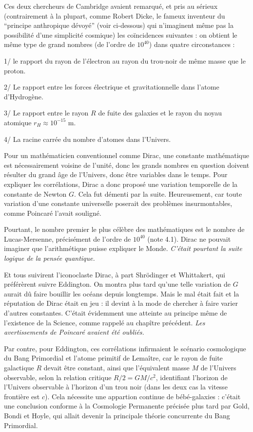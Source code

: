 \documentclass[a4paper,12pt]{article}
\begin{document}
     Ces deux chercheurs de Cambridge avaient remarqué, et pris au sérieux (contrairement à la plupart, comme Robert Dicke, le fameux inventeur du ``principe anthropique dévoyé'' (voir ci-dessous) qui n'imaginent même pas la possibilité d'une simplicité cosmique) les coïncidences suivantes : on obtient le même type de grand nombres (de l'ordre de $10^40$) dans quatre circonstances :

1/ le rapport du rayon de l'électron au rayon du trou-noir de même masse que le proton.

2/ Le rapport entre les forces électrique et gravitationnelle dans l'atome d'Hydrogène.

3/ Le rapport entre le rayon $R$ de fuite des galaxies et le rayon du noyau atomique $r_H \approx 10^{-15}$ m.

4/ La racine carrée du nombre d'atomes dans l'Univers.


Pour un mathématicien conventionnel comme Dirac, une constante mathématique est nécessairement voisine de l'unité, donc les grands nombres en question doivent résulter du grand âge de l'Univers, donc être variables dans le temps. Pour expliquer les corrélations, Dirac a donc proposé une variation temporelle de la constante de Newton $G$. Cela fut démenti par la suite. Heureusement, car toute variation d'une constante universelle poserait des problèmes insurmontables, comme Poincaré l'avait souligné. 

Pourtant, le nombre premier le plus célèbre des mathématiques est le nombre de Lucas-Mersenne, précisément de l'ordre de $10^{40}$ (note 4.1). Dirac ne pouvait imaginer que l'arithmétique puisse expliquer le Monde.\textit{ C'était pourtant la suite logique de la pensée quantique.}

Et tous suivirent l'iconoclaste Dirac, à part Shrödinger et Whittakert, qui préférèrent suivre Eddington. On montra plus tard qu'une telle variation de $G$ aurait dû faire bouillir les océans depuis longtemps. Mais le mal était fait et la réputation de Dirac était en jeu : il devint à la mode de chercher à faire varier d'autres constantes. C'était évidemment une atteinte au principe même de l'existence de la Science, comme rappelé au chapître précédent. \textit{Les avertissements de Poincaré avaient été oubliés.}
     
     Par contre, pour Eddington, ces corrélations infirmaient le scénario cosmologique du Bang Primordial et l'atome primitif de Lemaître, car le rayon de fuite galactique $R$ devait être constant, ainsi que l'équivalent masse $M$ de l'Univers observable, selon la relation critique  $R/2 = GM/c^2$, identifiant l'horizon de l'Univers observable à l'horizon d'un trou noir (dans les deux cas la vitesse frontière est $c$). Cela nécessite une appartion continue de bébé-galaxies : c'était une conclusion conforme à la Cosmologie Permanente précisée plus tard par Gold, Bondi et Hoyle, qui allait devenir la principale théorie concurrente du Bang Primordial. 
\end{document}
